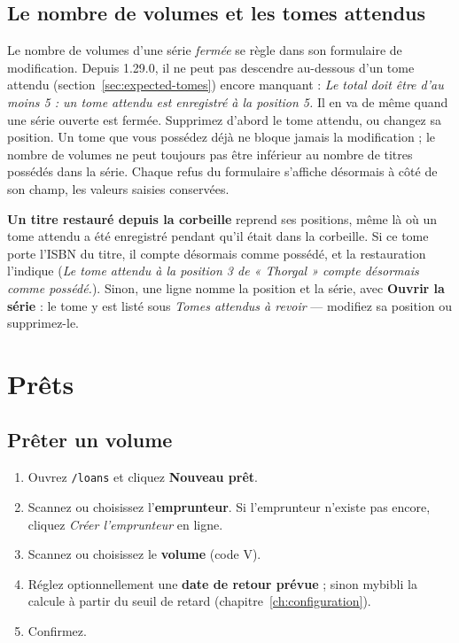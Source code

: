 \subsection*{Le nombre de volumes et les tomes attendus}
\label{sec:series-total}

Le nombre de volumes d'une série \emph{fermée} se règle dans son
formulaire de modification. Depuis 1.29.0, il ne peut pas descendre
au-dessous d'un tome attendu (section~\ref{sec:expected-tomes}) encore
manquant : \emph{Le total doit être d’au moins 5 : un tome attendu est
enregistré à la position 5.} Il en va de même quand une série ouverte
est fermée. Supprimez d'abord le tome attendu, ou changez sa position.
Un tome que vous possédez déjà ne bloque jamais la modification ; le
nombre de volumes ne peut toujours pas être inférieur au nombre de
titres possédés dans la série. Chaque refus du formulaire s'affiche
désormais à côté de son champ, les valeurs saisies conservées.

\textbf{Un titre restauré depuis la corbeille} reprend ses positions,
même là où un tome attendu a été enregistré pendant qu'il était dans la
corbeille. Si ce tome porte l'ISBN du titre, il compte désormais comme
possédé, et la restauration l'indique (\emph{Le tome attendu à la
position 3 de « Thorgal » compte désormais comme possédé.}). Sinon, une
ligne nomme la position et la série, avec \textbf{Ouvrir la série} : le
tome y est listé sous \emph{Tomes attendus à revoir} --- modifiez sa
position ou supprimez-le.

\section{Prêts}\label{sec:loans}

\subsection*{Prêter un volume}

\begin{enumerate}
  \item Ouvrez \texttt{/loans} et cliquez \textbf{Nouveau prêt}.
  \item Scannez ou choisissez l'\textbf{emprunteur}.
        Si l'emprunteur n'existe pas encore, cliquez \emph{Créer
        l'emprunteur} en ligne.
  \item Scannez ou choisissez le \textbf{volume} (code V).
  \item Réglez optionnellement une \textbf{date de retour
        prévue} ; sinon mybibli la calcule à partir du seuil de
        retard (chapitre~\ref{ch:configuration}).
  \item Confirmez.
\end{enumerate}

